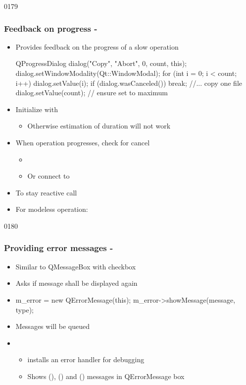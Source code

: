 \begin{slide}[fragile]{0179}
\frametitle{Feedback on progress - }
\begin{itemize}
  \item Provides feedback on the progress of a slow operation
   \begin{cpp}
QProgressDialog dialog("Copy", "Abort", 0, count, this);
dialog.setWindowModality(Qt::WindowModal);
for (int i = 0; i < count; i++) {
  dialog.setValue(i);
  if (dialog.wasCanceled()) { break; }
  //... copy one file
}
dialog.setValue(count); // ensure set to maximum      
    \end{cpp}
  \item Initialize with 
    \begin{itemize}
    \item Otherwise estimation of duration will not work
    \end{itemize}
  \item When operation progresses, check for cancel
    \begin{itemize}
    \item {}
    \item Or connect to 
    \end{itemize}
  \item To stay reactive call 
  \item For modeless operation: 
  \end{itemize}
\end{slide}

\begin{slide}[fragile]{0180}\frametitle{Providing error messages - }\label{qerrormessage}
  \begin{itemize}
  \item Similar to QMessageBox with checkbox
  \item Asks if message shall be displayed again
 \item[]
    \begin{cpp}
m_error = new QErrorMessage(this);
m_error->showMessage(message, type);
    \end{cpp}
\item Messages will be queued
  \item {}
    \begin{itemize}
   \item installs an error handler for debugging
    \item Shows (), () and
    () messages in QErrorMessage box
    \end{itemize}
\end{itemize}
\end{slide}

